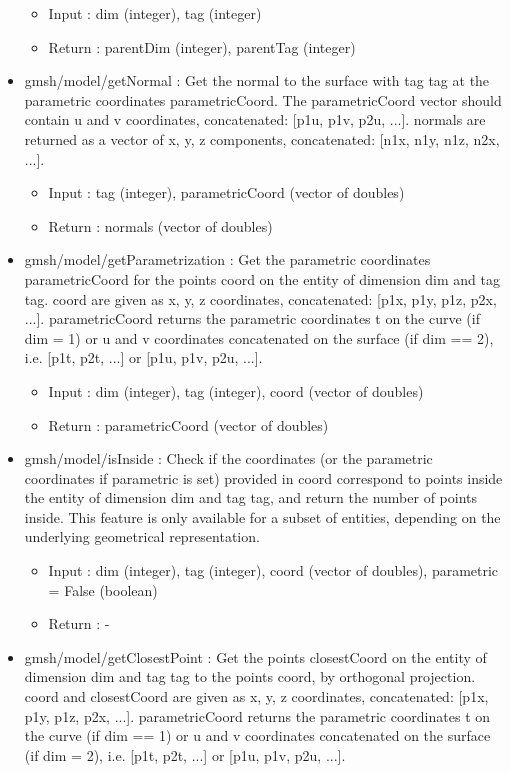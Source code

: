 \documentclass[dvipdfmx, 9pt, a4paper]{article}
\numberwithin{equation}{section}
\begin{document}
\begin{itemize}
\begin{itemize}
\item Input : dim (integer), tag (integer)
\item Return : parentDim (integer), parentTag (integer)
\end{itemize}
\item gmsh/model/getNormal : Get the normal to the surface with tag tag at the parametric coordinates parametricCoord. The parametricCoord vector should contain u and v coordinates, concatenated: [p1u, p1v, p2u, ...]. normals are returned as a vector of x, y, z components, concatenated: [n1x, n1y, n1z, n2x, ...].
\begin{itemize}
\item Input : tag (integer), parametricCoord (vector of doubles)
\item Return : normals (vector of doubles)
\end{itemize}
\item gmsh/model/getParametrization : Get the parametric coordinates parametricCoord for the points coord on the entity of dimension dim and tag tag. coord are given as x, y, z coordinates, concatenated: [p1x, p1y, p1z, p2x, ...]. parametricCoord returns the parametric coordinates t on the curve (if dim = 1) or u and v coordinates concatenated on the surface (if dim == 2), i.e. [p1t, p2t, ...] or [p1u, p1v, p2u, ...].
\begin{itemize}
\item Input : dim (integer), tag (integer), coord (vector of doubles)
\item Return : parametricCoord (vector of doubles)
\end{itemize}
\item gmsh/model/isInside : Check if the coordinates (or the parametric coordinates if parametric is set) provided in coord correspond to points inside the entity of dimension dim and tag tag, and return the number of points inside. This feature is only available for a subset of entities, depending on the underlying geometrical representation.
\begin{itemize}
\item Input : dim (integer), tag (integer), coord (vector of doubles), parametric = False (boolean)
\item Return : -
\end{itemize}
\item gmsh/model/getClosestPoint : Get the points closestCoord on the entity of dimension dim and tag tag to the points coord, by orthogonal projection. coord and closestCoord are given as x, y, z coordinates, concatenated: [p1x, p1y, p1z, p2x, ...]. parametricCoord returns the parametric coordinates t on the curve (if dim == 1) or u and v coordinates concatenated on the surface (if dim = 2), i.e. [p1t, p2t, ...] or [p1u, p1v, p2u, ...].

\end{itemize}
\end{document}
